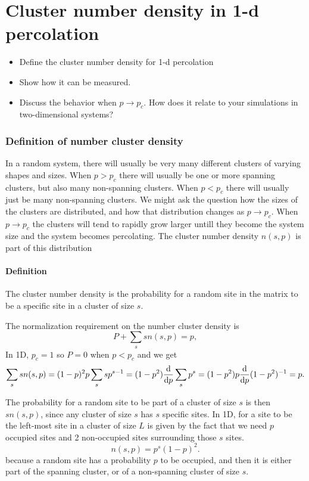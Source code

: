 \documentclass[a4paper, 11pt, notitlepage, english]{article}
\renewcommand{\d}{{\rm d}}
\begin{document}
\clearpage

\section{ Cluster number density in 1-d percolation}
\begin{itemize}
	\item Define the cluster number density for 1-d percolation
	\item Show how it can be measured.
	\item Discuss the behavior when $p \to p_c$. How does it relate to your simulations in two-dimensional systems?
\end{itemize}

\subsubsection*{Definition of number cluster density}

In a random system, there will usually be very many different clusters of varying shapes and sizes. When $p > p_c$ there will usually be one or more spanning clusters, but also many non-spanning clusters. When $p < p_c$ there will usually just be many non-spanning clusters. We might ask the question how the sizes of the clusters are distributed, and how that distribution changes as $p \to p_c$. When $p\to p_c$ the clusters will tend to rapidly grow larger untill they become the system size and the system becomes percolating. The cluster number density $n(s,p)$ is part of this distribution

\paragraph{Definition} 
The cluster number density is the probability for a random site in the matrix to be a specific site in a cluster of size $s$.

The normalization requirement on the number cluster density is
$$P + \sum_s s n(s,p) = p,$$
In 1D, $p_c = 1$ so $P = 0$ when $p<p_c$ and we get
$$\sum_s s n(s,p) = (1-p)^2 p \sum_s s p^{s-1} =  (1-p^2) \frac{\d}{\d p} \sum_s p^s = (1-p^2) p \frac{\d}{\d p} (1-p^2)^{-1} = p.$$


The probability for a random site to be part of a cluster of size $s$ is then $sn(s,p)$, since any cluster of size $s$ has $s$ specific sites. In 1D, for a site to be the left-most site in a cluster of size $L$ is given by the fact that we need $p$ occupied sites and 2 non-occupied sites surrounding those $s$ sites.
$$n(s,p) = p^s (1-p)^2.$$
because a random site has a probability $p$ to be occupied, and then it is either part of the spanning cluster, or of a non-spanning cluster of size $s$. 
\end{document}
